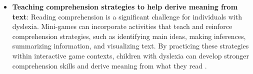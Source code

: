 \begin{itemize}
    \item \textbf{Teaching comprehension strategies to help derive meaning from text}: Reading comprehension is a significant challenge for individuals with dyslexia. Mini-games can incorporate activities that teach and reinforce comprehension strategies, such as identifying main ideas, making inferences, summarizing information, and visualizing text. By practicing these strategies within interactive game contexts, children with dyslexia can develop stronger comprehension skills and derive meaning from what they read \cite{dyslexiaUnderstanding}. 
\end{itemize}